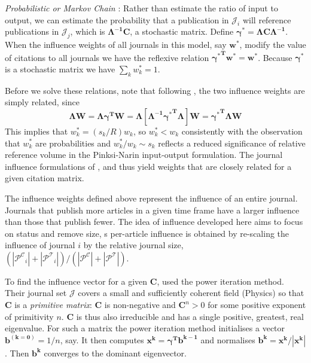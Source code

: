 \documentclass[12pt]{article}
\begin{document}
\textit{Probabilistic or Markov Chain} \citep{gellerCitationInfluenceMethodology1978, bergstromEigenfactorMeasuringValue2007}:
Rather than estimate the ratio of input to output, we can estimate the probability that a publication in $\mathcal{J}_{i}$ will reference publications in $\mathcal{J}_{j}$, which is $\mathbf{\Lambda^{-1} C}$, a stochastic matrix. Define $\mathbf{\gamma^{*} = \Lambda C \Lambda^{-1}}$. When the influence weights of all journals in this model, say $\mathbf{w^{*}}$, modify the value of citations to all journals we have the reflexive relation $\mathbf{{\gamma^{*}}^{T} w^{*} = w^{*}}$. Because $\mathbf{\gamma^{*}}$ is a stochastic matrix we have $\sum_k w^{*}_k = 1$.

Before we solve these relations, note that following \cite{gellerCitationInfluenceMethodology1978}, the two influence weights are simply related, since 
\[
\mathbf{\Lambda W = \Lambda \gamma^{T} W = \Lambda \left [\Lambda^{-1} {\gamma^{*}}^{T} \Lambda \right] W = {\gamma^{*}}^{T} \Lambda W}
\]
This implies that $w^{*}_k = (s_k/R) w_k$, so $w^{*}_k < w_k$ consistently with the observation that $w^{*}_k$ are probabilities and $w^{*}_k/w_k \sim s_k$ reflects a reduced significance of relative reference volume in the Pinksi-Narin input-output formulation. The journal influence formulations of \cite{pinskiCitationInfluenceJournal1976}, \cite{gellerCitationInfluenceMethodology1978} and \cite{bergstromEigenfactorMeasuringValue2007} thus yield weights that are closely related for a given citation matrix.

The influence weights defined above represent the influence of an entire journal. Journals that publish more articles in a given time frame have a larger influence than those that publish fewer. The idea of influence developed here aims to focus on status and remove size, s per-article influence is obtained by re-scaling the influence of journal $i$ by the relative journal size, $\left (|\mathcal{P^C}_{i}| + |\mathcal{P^T}_{i}| \right ) / \left (|\mathcal{P^C}| + |\mathcal{P^T}| \right)$.

To find the influence vector for a given $\mathbf{C}$, \cite{pinskiCitationInfluenceJournal1976} used the power iteration method. Their journal set $\mathcal{J}$ covers a small and sufficiently coherent field (Physics) so that $\mathbf{C}$ is a \textit{primitive matrix}: $\mathbf{C}$ is non-negative and $\mathbf{C}^n > 0$ for some positive exponent of primitivity $n$. $\mathbf{C}$ is thus also irreducible and has a single positive, greatest, real eigenvalue.  For such a matrix the power iteration method initialises a vector $\mathbf{b^{(k=0)}} = 1/n$, say. It then computes $\mathbf{x^{k} = \gamma^{T} b^{k-1}}$ and normalises $\mathbf{b^{k} = x^{k}/\left| x^{k} \right |}$. Then $\mathbf{b^{k}}$ converges to the dominant eigenvector.
\end{document}
